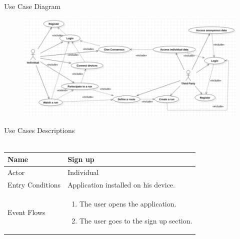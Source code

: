 \documentclass{article}
\begin{document}
\begin{legal}
\begin{legal}
\begin{legal}
{\begin{legal}
		\end{legal}
		}
    		\item Use Case Diagram
    			\begin{figure}[H]
			  	\includegraphics[width=\linewidth]{./images/usecase.png}
				\end{figure}
				\item Use Cases Descriptions\\\\
				\begin{tabular}{| m{3.5cm} | m{8cm}| }
				\hline
					Name & Sign up\\
				\hline
					Actor & Individual\\
				\hline
					Entry Conditions & Application installed
				on his device.\\
				\hline
					Event Flows & \begin{enumerate}
									\item The user opens the application.
									\item The user goes to the sign up section.
									

\end{enumerate}
\end{tabular}
\end{legal}
\end{legal}
\end{legal}
\end{document}
